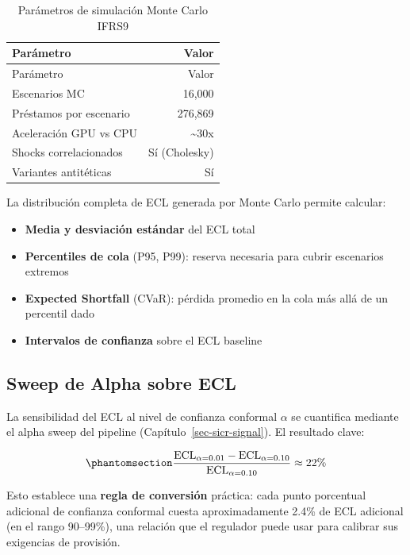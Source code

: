 \documentclass[
  spanish,
  11pt,
  letterpaper,
]{scrbook}
\providecommand{\tightlist}{%
  \setlength{\itemsep}{0pt}\setlength{\parskip}{0pt}}
\theoremstyle{plain}
\theoremstyle{remark}
\begin{document}
\begin{longtable}[]{@{}lr@{}}
\caption{Parámetros de simulación Monte Carlo
IFRS9}\label{tbl-mc-params}\tabularnewline
\toprule\noalign{}
Parámetro & Valor \\
\midrule\noalign{}
\endfirsthead
\toprule\noalign{}
Parámetro & Valor \\
\midrule\noalign{}
\endhead
\bottomrule\noalign{}
\endlastfoot
Escenarios MC & 16,000 \\
Préstamos por escenario & 276,869 \\
Aceleración GPU vs CPU & \textasciitilde30x \\
Shocks correlacionados & Sí (Cholesky) \\
Variantes antitéticas & Sí \\
\end{longtable}

La distribución completa de ECL generada por Monte Carlo permite
calcular:

\begin{itemize}
\tightlist
\item
  \textbf{Media y desviación estándar} del ECL total
\item
  \textbf{Percentiles de cola} (P95, P99): reserva necesaria para cubrir
  escenarios extremos
\item
  \textbf{Expected Shortfall} (CVaR): pérdida promedio en la cola más
  allá de un percentil dado
\item
  \textbf{Intervalos de confianza} sobre el ECL baseline
\end{itemize}

\subsection{Sweep de Alpha sobre ECL}\label{sweep-de-alpha-sobre-ecl}

La sensibilidad del ECL al nivel de confianza conformal \(\alpha\) se
cuantifica mediante el alpha sweep del pipeline
(Capítulo~\ref{sec-sicr-signal}). El resultado clave:

\begin{equation}\protect\phantomsection\label{eq-alpha-sensitivity}{
\frac{\text{ECL}_{\alpha=0.01} - \text{ECL}_{\alpha=0.10}}{\text{ECL}_{\alpha=0.10}} \approx 22\%
}\end{equation}

Esto establece una \textbf{regla de conversión} práctica: cada punto
porcentual adicional de confianza conformal cuesta aproximadamente 2.4\%
de ECL adicional (en el rango 90--99\%), una relación que el regulador
puede usar para calibrar sus exigencias de provisión.
\end{document}
